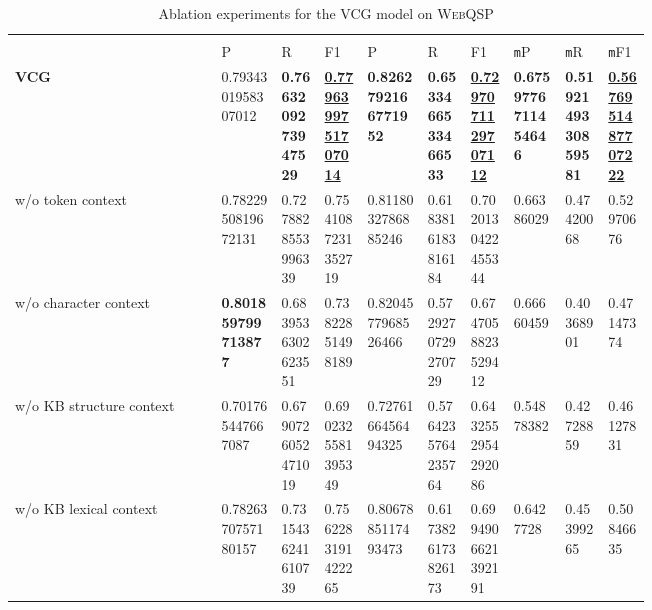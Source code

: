 \documentclass[11pt,a4paper]{article}
\begin{document}
  
\begin{table*}[t]
  \begin{center}
    \begin{tabular}{>{\raggedleft}p{0.24\linewidth}
      >{\raggedleft}p{0.07\linewidth}
      >{\raggedleft}p{0.05\linewidth}
      >{\raggedleft}p{0.05\linewidth}
      >{\raggedleft}p{0.07\linewidth}
      >{\raggedleft}p{0.05\linewidth}
      >{\raggedleft}p{0.05\linewidth}
      >{\raggedleft}p{0.06\linewidth}
      >{\raggedleft}p{0.05\linewidth}
      >{\raggedleft\arraybackslash}p{0.05\linewidth}}
      \toprule
      & \multicolumn{3}{c}{Main entity} & \multicolumn{6}{c}{All entities} \\  
       & P & R & F1 & P & R & F1 & \texttt{m}P & \texttt{m}R & \texttt{m}F1\\ 
       \midrule 
       \textbf{VCG}  & \num{0.7934301958307012} & \textbf{\num{0.7663209273947529}} & \underline{\textbf{\num{0.7796399751707014}}}  
       & \textbf{\num{0.8262792166771952}} & \textbf{\num{0.6533466533466533}} & \underline{\textbf{\num{0.7297071129707112}}} 
       & \textbf{\num{0.6759776711454646}} & \textbf{\num{0.5192149330859581}} & \underline{\textbf{\num{0.5676951487707222}}} \\
        w/o token context & \num{0.7822950819672131} & \num{0.7278828553996339} & \num{0.7541087231352719}  
        & \num{0.8118032786885246} & \num{0.6183816183816184} & \num{0.7020130422455344} 
       	& \num{0.66386029} & \num{0.47420068} & \num{0.52970676} \\
        w/o character context & \textbf{\num{0.801859799713877}} & \num{0.6839536302623551} & \num{0.73822851498189}  
        & \num{0.8204577968526466} & \num{0.5729270729270729} & \num{0.6747058823529412} 
       	& \num{0.66660459} & \num{0.40368901} & \num{0.47147374} \\
        w/o KB structure context & \num{0.701765447667087} & \num{0.6790726052471019} & \num{0.6902325581395349}  
        & \num{0.7276166456494325} & \num{0.5764235764235764} & \num{0.6432552954292086} 
       	& \num{0.54878382} & \num{0.42728859} & \num{0.46127831} \\
        w/o KB lexical context & \num{0.7826370757180157} & \num{0.7315436241610739} & \num{0.7562283191422265}  
        & \num{0.8067885117493473} & \num{0.6173826173826173} & \num{0.6994906621392191} 
       	& \num{0.6427728} & \num{0.45399265} & \num{0.50846635} \\ 
      \bottomrule
      \end{tabular} 
  \end{center}
  \caption{Ablation experiments for the VCG model on \textsc{WebQSP}\label{table:ablation-webqsp-test}}
\end{table*}
\end{document}
